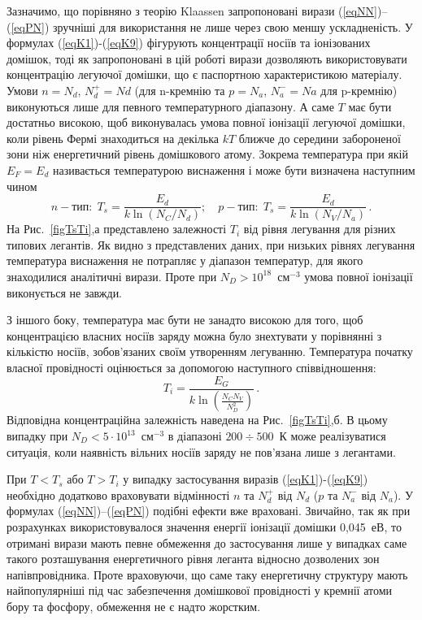 \documentclass[12pt,a4paper,titlepage,oneside]{book}
\numberwithin{equation}{part}
\begin{document}
Зазначимо, що порівняно з теорію Klaassen запропоновані вирази (\ref{eqNN})--(\ref{eqPN}) зручніші для використання не лише через свою меншу ускладненість.
У формулах (\ref{eqK1})-(\ref{eqK9}) фігурують концентрації носіїв та іонізованих домішок, тоді як запропоновані в цій роботі вирази
дозволяють використовувати концентрацію легуючої домішки, що є паспортною характеристикою матеріалу.
Умови $n=N_d$, $N_d^+=Nd$ (для n-кремнію та $p=N_a$, $N_a^-=Na$ для p-кремнію) виконуються лише для певного температурного діапазону.
А саме $T$ має бути достатньо високою, щоб виконувалась умова повної іонізації легуючої домішки,
коли рівень Фермі знаходиться на декілька $kT$ ближче до середини забороненої зони
ніж енергетичний рівень домішкового атому.
Зокрема температура при якій $E_F=E_d$ називається температурою виснаження і може бути визначена наступним чином
\begin{equation}\label{eqTs}
  n-\text{тип}:\;T_s=\frac{E_d}{k\ln(N_C/N_d)};\quad p-\text{тип}:\;T_s=\frac{E_d}{k\ln(N_V/N_a)}\,.
\end{equation}
На Рис.~\ref{figTsTi},а представлено залежності $T_i$ від рівня легування для різних типових легантів.
Як видно з представлених даних, при низьких рівнях легування температура виснаження не потрапляє
у діапазон температур, для якого знаходилися аналітичні вирази.
Проте при $N_D>10^{18}$~см$^{-3}$ умова повної іонізації виконується не завжди.

З іншого боку, температура має бути не занадто високою для того, щоб концентрацією власних носіїв заряду можна було знехтувати
у порівнянні з кількістю носіїв, зобов'язаних своїм утворенням легуванню.
Температура початку власної провідності оцінюється за допомогою наступного співвідношення:
\begin{equation}\label{eqTi}
  T_i=\frac{E_G}{k \ln\left(\frac{N_C N_V}{N_D^2}\right)}\,.
\end{equation}
Відповідна концентраційна залежність наведена на Рис.~\ref{figTsTi},б.
В цьому випадку при $N_D<5\cdot 10^{13}$~см$^{-3}$ в діапазоні $200\div500$~К може реалізуватися ситуація,
коли наявність вільних носіїв заряду не пов'язана лише з легантами.



При $T<T_s$ або $T>T_i$ у випадку застосування виразів (\ref{eqK1})-(\ref{eqK9}) необхідно додатково враховувати
відмінності $n$ та $N_d^+$ від $N_d$ ($p$ та $N_a^-$ від $N_a$).
У формулах (\ref{eqNN})--(\ref{eqPN}) подібні ефекти вже враховані.
Звичайно, так як при розрахунках використовувалося значення енергії іонізації домішки 0,045~еВ, то отримані
вирази мають певне обмеження до застосування лише у випадках саме такого розташування енергетичного рівня леганта відносно дозволених зон
напівпровідника.
Проте враховуючи, що саме таку енергетичну структуру мають найпопулярніші під час забезпечення домішкової провідності у кремнії атоми бору та фосфору,
обмеження не є надто жорстким.
\end{document}
